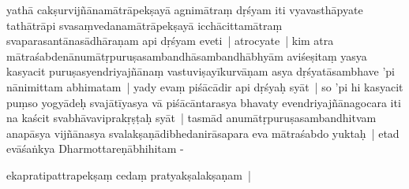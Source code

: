 \documentclass[article,12pt,a4paper]{memoir}%
\newcounter{parCount}
\begin{document}
yathā cakṣurvijñānamātrāpekṣayā agnimātraṃ dṛśyam iti vyavasthāpyate tathātrāpi svasaṃvedanamātrāpekṣayā icchācittamātraṃ svaparasantānasādhāraṇam api dṛśyam eveti | \label{thakur75-146.16} atrocyate | kim atra mātraśabdenānumātṛpuruṣasambandhāsambandhābhyām aviśeṣitaṃ yasya kasyacit puruṣasyendriyajñānaṃ vastuviṣayīkurvāṇam asya dṛśyatāsambhave 'pi nānimittam abhimatam | yady evaṃ piśācādir api dṛśyaḥ syāt | so 'pi hi kasyacit puṃso yogyādeḥ svajātīyasya vā piśācāntarasya bhavaty evendriyajñānagocara iti na kaścit svabhāvaviprakṛṣṭaḥ syāt | tasmād anumātṛpuruṣasambandhitvam anapāsya vijñānasya svalakṣaṇādibhedanirāsapara eva mātraśabdo yuktaḥ | etad evāśaṅkya Dharmottareṇābhihitam -
	{}
	\pend%
      

	  \pstart \leavevmode%
	ekapratipattrapekṣaṃ cedaṃ pratyakṣalakṣaṇam | 
	{}
	\pend%
      
\end{document}
